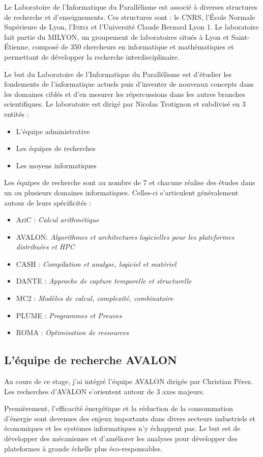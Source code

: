 \documentclass{article}
\newcommand{\CNRS}{CNRS\xspace}
\newcommand{\UCBL}{Université Claude Bernard Lyon 1\xspace}
\newcommand{\ENS}{École Normale Supérieure\xspace}
\newcommand{\LIP}{Laboratoire de l'Informatique du Parallélisme\xspace}
\newcommand{\INRIA}{\textsc{Inria}\xspace}
\newcommand{\MILYON}{MILYON\xspace}
\newcommand{\avalon}{AVALON\xspace}
\begin{document}
Le \LIP est associé à diverses structures de recherche et d'enseignements. Ces
structures sont : le \CNRS, l'\ENS de Lyon, l'\INRIA et l'\UCBL. Le laboratoire
fait partie du \MILYON, un groupement de laboratoires situés à Lyon et
Saint-Étienne, composé de 350 chercheurs en informatique et mathématiques et
permettant de développer la recherche interdisciplinaire.

Le but du \LIP est d'étudier les fondements de l'informatique actuels puis
d'inventer de nouveaux concepts dans les domaines ciblés et d'en  mesurer les
répercussions dans les autres branches scientifiques.
Le laboratoire est dirigé par Nicolas Trotignon et subdivisé en 3 entités :
\begin{itemize}
	\item L'équipe administrative
	\item Les équipes de recherches
	\item Les moyens informatiques
\end{itemize}

Les équipes de recherche sont au nombre de 7 et chacune réalise des études dans
un ou plusieurs domaines informatiques. Celles-ci s'articulent généralement
autour de leurs spécificités :
\begin{itemize}
	\item  AriC : \emph{Calcul arithmétique}
	\item  \avalon : \emph{Algorithmes et architectures logicielles pour
	les plateformes distribuées et HPC}
	\item  CASH : \emph{Compilation et analyse, logiciel et matériel}
	\item  DANTE : \emph{Approche de capture temporelle et structurelle}
	\item  MC2 : \emph{Modèles de calcul, complexité, combinatoire}
	\item  PLUME : \emph{Programmes et Preuves}
	\item  ROMA : \emph{Optimisation de ressources}
\end{itemize}

\subsection{L'équipe de recherche \avalon}\label{equipe_avalon}

Au cours de ce stage, j'ai intégré l'équipe \avalon dirigée par Christian Pérez.
Les recherches d'\avalon s'orientent autour de 3 axes majeurs.

Premièrement, l'efficacité énergétique et la réduction de la consommation
d'énergie sont devenues  des enjeux importants dans divers secteurs industriels
et économiques et les systèmes informatiques  n'y échappent pas. Le but est de
développer des mécanismes et d'améliorer les analyses pour développer des
plateformes à grande échelle plus éco-responsables.
\end{document}
